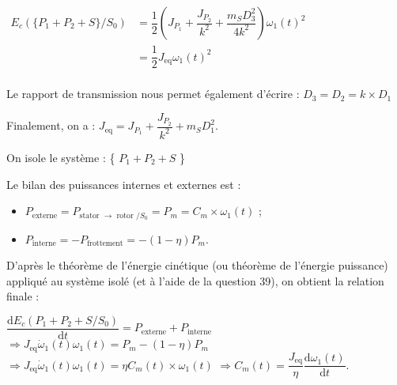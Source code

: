 \ifprof
\begin{corrige}
$\begin{array}{ll}
E_c(\{P_1+P_2+S\}/S_0) &= \dfrac{1}{2} \left(  J_{P_1} + \dfrac{J_{P_2}}{k^2} + \dfrac{m_S D_3^2}{4 k^2}\right) \omega_1(t)^2 \\
&= \dfrac{1}{2} J_\text{eq} \omega_1(t)^2 \\
\end{array}$

Le rapport de transmission nous permet également d'écrire : $D_3 = D_2 = k \times D_1$

Finalement, on a : $ J_\text{eq} = J_{P_1} + \dfrac{J_{P_2}}{k^2} + m_S D_1^2$.
\end{corrige}
\else
\fi
\ifprof
\begin{corrige}
On isole le système : \{ $P_1 + P_2 + S$ \}

Le bilan des puissances internes et externes est :
\begin{itemize}
\item $P_\text{externe} = P_\text{stator $\to$ rotor $/S_0$} = P_m = C_m \times \omega_1(t)$ ;
\item $P_\text{interne} = -P_\text{frottement} = -(1 - \eta) P_m$.\\
\end{itemize}

D'après le théorème de l'énergie cinétique (ou théorème de l'énergie puissance) appliqué au système isolé (et à l'aide de la question 39), on obtient la relation finale :

$ \dfrac{\text{d} E_c(P_1+P_2+S/S_0)}{\text{d}t} = P_\text{externe} + P_\text{interne}$
$ \Rightarrow  J_\text{eq} \dot\omega_1(t) \omega_1(t) = P_m  - (1 - \eta) P_m$
$ \Rightarrow  J_\text{eq} \dot\omega_1(t) {\omega_1(t)} = \eta C_m(t) \times {\omega_1(t)}$
$ \Rightarrow   C_m(t) = \dfrac{J_\text{eq}}{\eta} \dfrac{\text{d}\omega_1(t)}{\text{d}t}$.

\end{corrige}
\else
\fi

